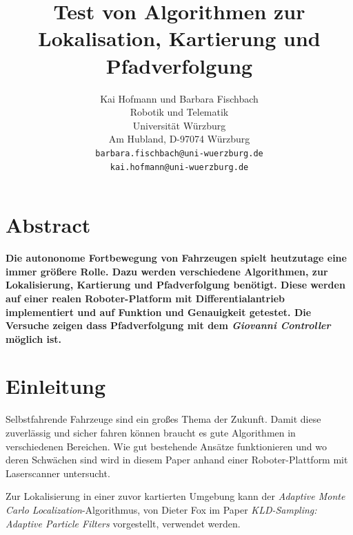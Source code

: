 \documentclass[11pt,a4paper]{article}
\begin{document}
\sloppy

\title{\Large\bf Test von Algorithmen zur Lokalisation, Kartierung und Pfadverfolgung }

\author{Kai Hofmann und Barbara Fischbach\\
  Robotik und Telematik \\
  Universit\"at W\"urzburg\\
  Am Hubland, D-97074 W\"urzburg\\
{\small \texttt{barbara.fischbach@uni-wuerzburg.de}}\\
{\small \texttt{kai.hofmann@uni-wuerzburg.de}}}

\date{}



\maketitle


\newpage

\twocolumn

\section*{Abstract}


	\textbf{Die autononome Fortbewegung von Fahrzeugen spielt heutzutage eine immer gr\"o\ss{}ere Rolle. Dazu werden verschiedene Algorithmen, zur Lokalisierung, Kartierung und Pfadverfolgung ben\"otigt. Diese werden auf einer realen Roboter-Platform mit Differentialantrieb implementiert und auf Funktion und Genauigkeit getestet. Die Versuche zeigen dass Pfadverfolgung mit dem \textit{Giovanni Controller} m\"oglich ist. }

\section{Einleitung}
	Selbstfahrende Fahrzeuge sind ein gro{\ss}es Thema der Zukunft. Damit diese zuverl\"assig und sicher fahren k\"onnen braucht es gute Algorithmen in verschiedenen Bereichen. Wie gut bestehende Ans\"atze funktionieren und wo deren Schw\"achen sind wird in diesem Paper anhand einer Roboter-Plattform mit Laserscanner untersucht. 

	Zur Lokalisierung in einer zuvor kartierten Umgebung kann der \textit{Adaptive Monte Carlo Localization}-Algorithmus, von Dieter Fox im Paper \textit{KLD-Sampling: Adaptive Particle Filters} \cite{amclPaper} vorgestellt, verwendet werden. 
	
\end{document}

